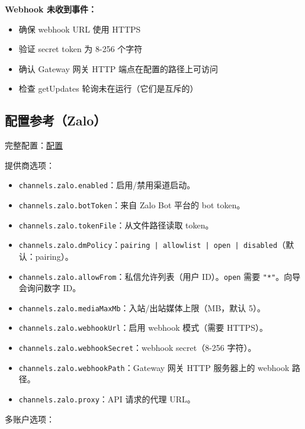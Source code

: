 \textbf{Webhook 未收到事件：}

\begin{itemize}
  \item 确保 webhook URL 使用 HTTPS
  \item 验证 secret token 为 8-256 个字符
  \item 确认 Gateway 网关 HTTP 端点在配置的路径上可访问
  \item 检查 getUpdates 轮询未在运行（它们是互斥的）
\end{itemize}


\subsection{配置参考（Zalo）}


完整配置：\href{/gateway/configuration}{配置}

提供商选项：

\begin{itemize}
  \item \texttt{channels.zalo.enabled}：启用/禁用渠道启动。
  \item \texttt{channels.zalo.botToken}：来自 Zalo Bot 平台的 bot token。
  \item \texttt{channels.zalo.tokenFile}：从文件路径读取 token。
  \item \texttt{channels.zalo.dmPolicy}：\texttt{pairing | allowlist | open | disabled}（默认：pairing）。
  \item \texttt{channels.zalo.allowFrom}：私信允许列表（用户 ID）。\texttt{open} 需要 \texttt{"*"}。向导会询问数字 ID。
  \item \texttt{channels.zalo.mediaMaxMb}：入站/出站媒体上限（MB，默认 5）。
  \item \texttt{channels.zalo.webhookUrl}：启用 webhook 模式（需要 HTTPS）。
  \item \texttt{channels.zalo.webhookSecret}：webhook secret（8-256 字符）。
  \item \texttt{channels.zalo.webhookPath}：Gateway 网关 HTTP 服务器上的 webhook 路径。
  \item \texttt{channels.zalo.proxy}：API 请求的代理 URL。
\end{itemize}


多账户选项：

